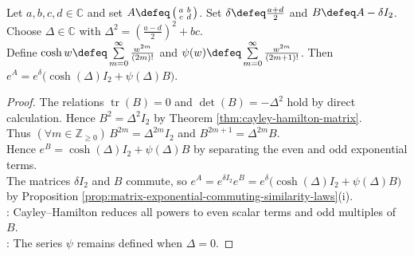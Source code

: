 \begin{proposition} \label{prop:two-by-two-matrix-exponential-closed-form} \\
Let $a,b,c,d\in\mathbb{C}$ and set $A\defeq\left(\begin{smallmatrix}a&b\\c&d\end{smallmatrix}\right)$. Set $\delta\defeq\frac{a+d}{2}$ and $B\defeq A-\delta I_2$. Choose $\Delta\in\mathbb{C}$ with $\Delta^2=\left(\frac{a-d}{2}\right)^2+bc$.\\
Define $\cosh w\defeq\sum\limits_{m=0}^{\infty}\frac{w^{2m}}{(2m)!}$ and $\psi(w)\defeq\sum\limits_{m=0}^{\infty}\frac{w^{2m}}{(2m+1)!}$. Then $e^A=e^{\delta}\bigl(\cosh(\Delta)I_2+\psi(\Delta)B\bigr)$.
\begin{proof}
The relations $\operatorname{tr}(B)=0$ and $\det(B)=-\Delta^2$ hold by direct calculation. Hence $B^2=\Delta^2I_2$ by Theorem \ref{thm:cayley-hamilton-matrix}.\\
Thus $(\forall m\in\mathbb{Z}_{\geq0})\,B^{2m}=\Delta^{2m}I_2$ and $B^{2m+1}=\Delta^{2m}B$.\\
Hence $e^B=\cosh(\Delta)I_2+\psi(\Delta)B$ by separating the even and odd exponential terms.\\
The matrices $\delta I_2$ and $B$ commute, so $e^A=e^{\delta I_2}e^B=e^{\delta}\bigl(\cosh(\Delta)I_2+\psi(\Delta)B\bigr)$ by Proposition \ref{prop:matrix-exponential-commuting-similarity-laws}(i).\\
: Cayley--Hamilton reduces all powers to even scalar terms and odd multiples of $B$.\\
: The series $\psi$ remains defined when $\Delta=0$.
\end{proof}
\end{proposition}

